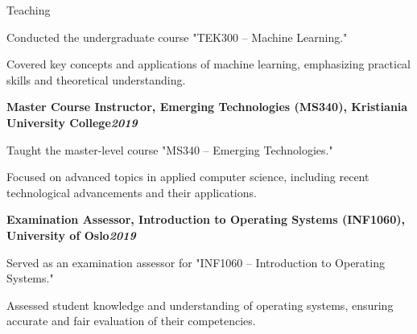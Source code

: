 \begin{rubric}{Teaching}
\begin{compactitem}
    \item Conducted the undergraduate course "TEK300 – Machine Learning."
    \item Covered key concepts and applications of machine learning, emphasizing practical skills and theoretical understanding.
    \vspace{-12pt}
\end{compactitem}
%
\entry*[]%
\textbf{Master Course Instructor, Emerging Technologies (MS340), Kristiania University College\hfill\textit{2019}} \par
\begin{compactitem}
    \item Taught the master-level course "MS340 – Emerging Technologies."
    \item Focused on advanced topics in applied computer science, including recent technological advancements and their applications.
    \vspace{-12pt}
\end{compactitem}
%
\entry*[]%
\textbf{Examination Assessor, Introduction to Operating Systems (INF1060), University of Oslo\hfill\textit{2019}} \par
\begin{compactitem}
    \item Served as an examination assessor for "INF1060 – Introduction to Operating Systems."
    \item Assessed student knowledge and understanding of operating systems, ensuring accurate and fair evaluation of their competencies.
    \vspace{-12pt}
\end{compactitem}
\end{rubric}